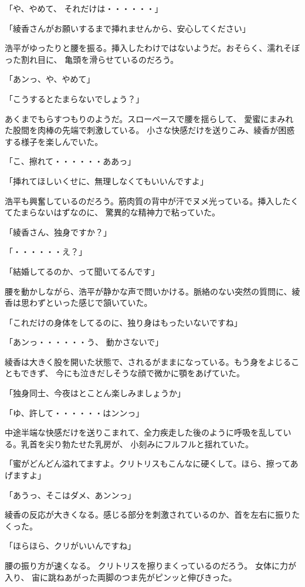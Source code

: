 ﻿\documentclass[book,tate]{jlreq}
\begin{document}
「や、やめて、 それだけは・・・・・・」

「綾香さんがお願いするまで挿れませんから、安心してください」

浩平がゆったりと腰を振る。挿入したわけではないようだ。おそらく、濡れそぼった割れ目に、
亀頭を滑らせているのだろう。

「あンっ、や、やめて」

「こうするとたまらないでしょう？」

あくまでもらすつもりのようだ。スローペースで腰を揺らして、
愛蜜にまみれた股間を肉棒の先端で刺激している。 小さな快感だけを送りこみ、綾香が困惑する様子を楽しんでいた。

「こ、擦れて・・・・・・ああっ」

「挿れてほしいくせに、無理しなくてもいいんですよ」

浩平も興奮しているのだろう。筋肉質の背中が汗でヌメ光っている。挿入したくてたまらないはずなのに、
驚異的な精神力で粘っていた。

「綾香さん、独身ですか？」

「・・・・・・え？」

「結婚してるのか、って聞いてるんです」

腰を動かしながら、浩平が静かな声で問いかける。脈絡のない突然の質問に、綾香は思わずといった感じで頷いていた。

「これだけの身体をしてるのに、独り身はもったいないですね」

「あンっ・・・・・・う、 動かさないで」

綾香は大きく股を開いた状態で、されるがままになっている。もう身をよじることもできず、
今にも泣きだしそうな顔で微かに顎をあげていた。

「独身同士、今夜はとことん楽しみましょうか」

「ゆ、許して・・・・・・はンンっ」

中途半端な快感だけを送りこまれて、全力疾走した後のように呼吸を乱している。乳首を尖り勃たせた乳房が、
小刻みにフルフルと揺れていた。

「蜜がどんどん溢れてますよ。クリトリスもこんなに硬くして。ほら、擦ってあげますよ」

「あうっ、そこはダメ、あンンっ」

綾香の反応が大きくなる。感じる部分を刺激されているのか、首を左右に振りたくった。

「ほらほら、クリがいいんですね」

腰の振り方が速くなる。 クリトリスを擦りまくっているのだろう。 女体に力が入り、
宙に跳ねあがった両脚のつま先がピンッと伸びきった。
\end{document}
